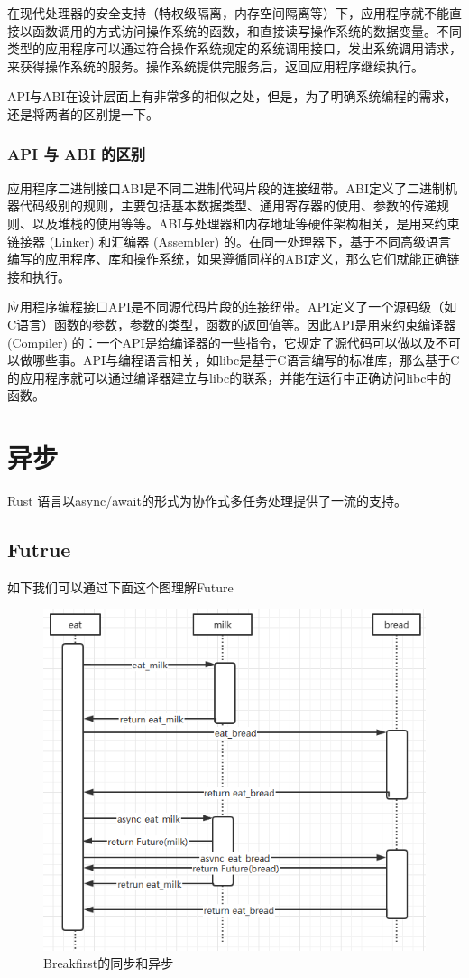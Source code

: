 在现代处理器的安全支持（特权级隔离，内存空间隔离等）下，应用程序就不能直接以函数调用的方式访问操作系统的函数，和直接读写操作系统的数据变量。不同类型的应用程序可以通过符合操作系统规定的系统调用接口，发出系统调用请求，来获得操作系统的服务。操作系统提供完服务后，返回应用程序继续执行。

API与ABI在设计层面上有非常多的相似之处，但是，为了明确系统编程的需求，还是将两者的区别提一下。

\subsubsection*{API 与 ABI 的区别}

应用程序二进制接口ABI是不同二进制代码片段的连接纽带。ABI定义了二进制机器代码级别的规则，主要包括基本数据类型、通用寄存器的使用、参数的传递规则、以及堆栈的使用等等。ABI与处理器和内存地址等硬件架构相关，是用来约束链接器 (Linker) 和汇编器 (Assembler) 的。在同一处理器下，基于不同高级语言编写的应用程序、库和操作系统，如果遵循同样的ABI定义，那么它们就能正确链接和执行。

应用程序编程接口API是不同源代码片段的连接纽带。API定义了一个源码级（如C语言）函数的参数，参数的类型，函数的返回值等。因此API是用来约束编译器 (Compiler) 的：一个API是给编译器的一些指令，它规定了源代码可以做以及不可以做哪些事。API与编程语言相关，如libc是基于C语言编写的标准库，那么基于C的应用程序就可以通过编译器建立与libc的联系，并能在运行中正确访问libc中的函数。


\section{异步}

Rust 语言以async/await的形式为协作式多任务处理提供了一流的支持。

\subsection{Futrue}

如下我们可以通过下面这个图理解Future

\begin{figure}[htb]
    \figureCapSet
    \centering
    \includegraphics[width=.8\linewidth]{figure/c2/breakfirstsequence.png}
    \caption{Breakfirst的同步和异步}
    \label{figure:c2breakfirstsequence}
\end{figure}


